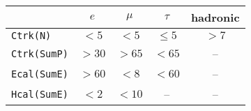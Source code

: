 \begin{tabular}{lcccc}
	\toprule
	 & $e$ & $\mu$ & $\tau$ & hadronic \\
	 \midrule
	\texttt{Ctrk(N)} & $<5$  & $<5$  & $\leq 5$ & $>7$ \\
	\texttt{Ctrk(SumP)} & $>30$ & $>65$ & $<65$ & --\\
	\texttt{Ecal(SumE)}  & $>60$ & $<8$  & $<60$ & -- \\
	\texttt{Hcal(SumE)}  & $<2$  & $<10$ & -- & -- \\
	\bottomrule
\end{tabular}